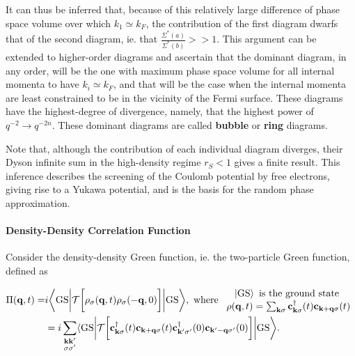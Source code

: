 \documentclass{homework}
\begin{document}
It can thus be inferred that, because of this relatively large difference of phase space volume over which $k_1 \simeq k_F$, the contribution of the first diagram dwarfs that of the second diagram, ie. that $
    \frac{\Sigma^{*}(a)}{\Sigma^{*}(b)} >> 1.  $ 
This argument can be extended to higher-order diagrams and ascertain that the dominant diagram, in any order, will be the one with maximum phase space volume for all internal momenta to have $k_i \simeq k_F$, and that will be the case when the internal momenta are least constrained to be in the vicinity of the Fermi surface. These diagrams have the highest-degree of divergence, namely, that the highest power of $q^{-2} \rightarrow q^{-2n}$. These dominant diagrams are called \textbf{bubble} or \textbf{ring} diagrams. 

Note that, although the contribution of each individual diagram diverges, their Dyson infinite sum in the high-density regime $r_S < 1$ gives a finite result. This inference describes the screening of the Coulomb potential by free electrons, giving rise to a Yukawa potential, and is the basis for the random phase approximation. \\

\clearpage

\paragraph{Density-Density Correlation Function}

Consider the density-density Green function, ie. the two-particle Green function, defined as 

\begin{equation}
\begin{split}
    \Pi({\bf q},t) =& i \bigg \langle \textnormal{GS} \bigg | \mathcal{T} \bigg[\rho_{\sigma}({\bf q},t) \rho_{\sigma}(-{\bf q},0)\bigg] \bigg | \textnormal{GS} \bigg \rangle, \textnormal{ where } \begin{array}{cc}
        \ket{\textnormal{GS}} \textnormal{ is the ground state } \\
        \rho({\bf q},t) = \sum_{{\bf k} \sigma} {\bf c}_{{\bf k} \sigma}^\dagger(t) {\bf c}_{{{\bf k+q} \sigma}}(t)
    \end{array} \\
    &= i \sum_{{\substack{ {\bf k k'}
    \\
    \sigma \sigma'
    }}} \langle \textnormal{GS} \bigg | \mathcal{T} \bigg[ 
      {\bf c}_{{\bf k} \sigma}^\dagger(t) 
      {\bf c}_{{{\bf k+q} \sigma}}(t)
      {\bf c}_{{\bf k}' \sigma'}^\dagger(0) {\bf c}_{{{\bf k'-q} \sigma'}}(0)
    \bigg] \bigg | \textnormal{GS} \bigg \rangle.
\end{split}
\label{HFRPA_density_density_gf}
\end{equation}
\end{document}
